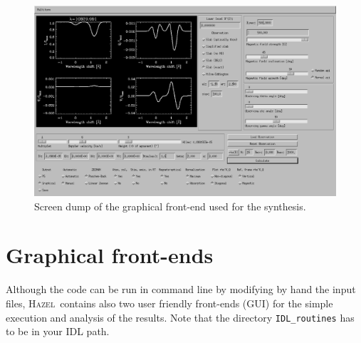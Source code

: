 \documentclass[12pt]{article}
\def\H{\textsc{Hazel}}
\begin{document}
\begin{figure}
\includegraphics[width=\columnwidth]{f5.eps}
\caption{Screen dump of the graphical front-end used for the synthesis.
\label{fig:synthesis_GUI}}
\end{figure}

\section{Graphical front-ends}
Although the code can be run in command line by modifying by hand the input files, 
\H\ contains also two user friendly front-ends (GUI) for the simple execution and
analysis of the results. Note that the directory \texttt{IDL\_routines} has to be
in your IDL path.
\end{document}
